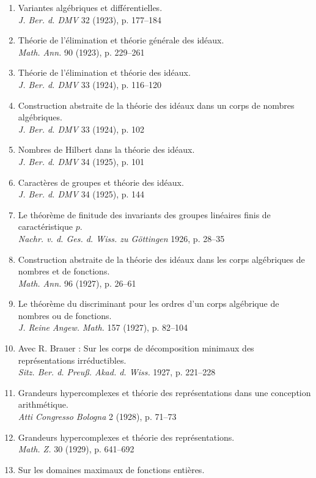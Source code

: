 \begin{enumerate}
\item Variantes algébriques et différentielles.\\
\emph{J. Ber. d. DMV} 32 (1923), p. 177--184
\item Théorie de l'élimination et théorie générale des idéaux.\\
\emph{Math. Ann.} 90 (1923), p. 229--261
\item Théorie de l'élimination et théorie des idéaux.\\
\emph{J. Ber. d. DMV} 33 (1924), p. 116--120
\item Construction abstraite de la théorie des idéaux dans un corps de nombres algébriques.\\
\emph{J. Ber. d. DMV} 33 (1924), p. 102
\item Nombres de Hilbert dans la théorie des idéaux.\\
\emph{J. Ber. d. DMV} 34 (1925), p. 101
\item Caractères de groupes et théorie des idéaux.\\
\emph{J. Ber. d. DMV} 34 (1925), p. 144
\item Le théorème de finitude des invariants des groupes linéaires finis de caractéristique $p$.\\
\emph{Nachr. v. d. Ges. d. Wiss. zu Göttingen} 1926, p. 28--35
\item Construction abstraite de la théorie des idéaux dans les corps algébriques de nombres et de fonctions.\\
\emph{Math. Ann.} 96 (1927), p. 26--61
\item Le théorème du discriminant pour les ordres d'un corps algébrique de nombres ou de fonctions.\\
\emph{J. Reine Angew. Math.} 157 (1927), p. 82--104
\item Avec R. Brauer : Sur les corps de décomposition minimaux des représentations irréductibles.\\
\emph{Sitz. Ber. d. Preuß. Akad. d. Wiss.} 1927, p. 221--228
\item Grandeurs hypercomplexes et théorie des représentations dans une conception arithmétique.\\
\emph{Atti Congresso Bologna} 2 (1928), p. 71--73
\item Grandeurs hypercomplexes et théorie des représentations.\\
\emph{Math. Z.} 30 (1929), p. 641--692
\item Sur les domaines maximaux de fonctions entières.\\

\end{enumerate}
